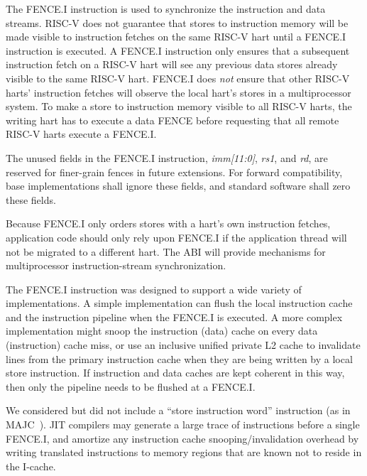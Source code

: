 The FENCE.I instruction is used to synchronize the instruction and
data streams.  RISC-V does not guarantee that stores to instruction
memory will be made visible to instruction fetches on the same RISC-V
hart until a FENCE.I instruction is executed.  A FENCE.I instruction
only ensures that a subsequent instruction fetch on a RISC-V hart
will see any previous data stores already visible to the same RISC-V
hart.  FENCE.I does {\em not} ensure that other RISC-V harts'
instruction fetches will observe the local hart's stores in a
multiprocessor system. To make a store to instruction memory visible
to all RISC-V harts, the writing hart has to execute a data FENCE
before requesting that all remote RISC-V harts execute a FENCE.I.

The unused fields in the FENCE.I instruction, {\em imm[11:0]}, {\em rs1}, and
{\em rd}, are reserved for finer-grain fences in future extensions.  For
forward compatibility, base implementations shall ignore these fields, and
standard software shall zero these fields.

\begin{commentary}
Because FENCE.I only orders stores with a hart's own instruction fetches,
application code should only rely upon FENCE.I if the application thread will
not be migrated to a different hart.  The ABI will provide mechanisms for
multiprocessor instruction-stream synchronization.
\end{commentary}

\begin{commentary}
The FENCE.I instruction was designed to support a wide variety of
implementations.  A simple implementation can flush the local
instruction cache and the instruction pipeline when the FENCE.I is
executed.  A more complex implementation might snoop the instruction
(data) cache on every data (instruction) cache miss, or use an
inclusive unified private L2 cache to invalidate lines from the
primary instruction cache when they are being written by a local store
instruction.  If instruction and data caches are kept coherent in this
way, then only the pipeline needs to be flushed at a FENCE.I.

We considered but did not include a ``store instruction word''
instruction (as in MAJC~\cite{majc}).  JIT compilers may generate a
large trace of instructions before a single FENCE.I, and amortize any
instruction cache snooping/invalidation overhead by writing translated
instructions to memory regions that are known not to reside in the
I-cache.
\end{commentary}
